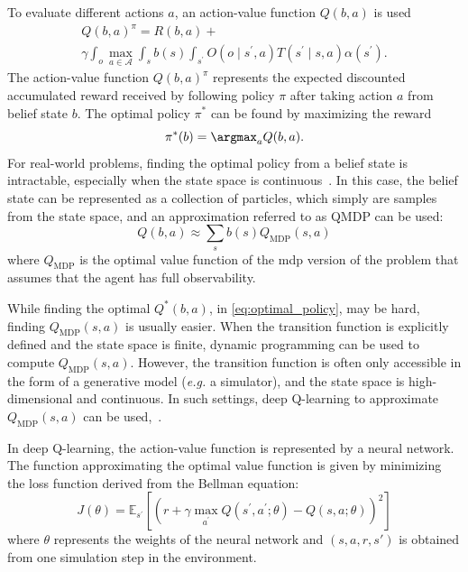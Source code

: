 To evaluate different actions $a$, an action-value function $Q(b, a)$ is used
\begin{equation}
    \begin{split}
        Q (b, a)^\pi = R(b,a) + \\
     \gamma \int_o \max_{a \in \mathcal{A}}\int_s b(s) \int_{s^\prime} O(o \mid s^\prime,a) T(s^\prime \mid s,a) \alpha(s^\prime).
    \end{split}
\end{equation}
The action-value function $Q(b, a)^\pi$ represents the expected discounted accumulated reward received by following policy $\pi$ after taking action $a$ from belief state $b$. The optimal policy $\pi^*$ can be found by maximizing the reward
\begin{equation}
    \pi^*(b) =\argmax_a Q(b, a).
    \label{eq:optimal_policy}
\end{equation}
For real-world problems, finding the optimal policy from a belief state is intractable, especially when the state space is continuous~\cite{Kochenderfer2015}. 
In this case, the belief state can be represented as a collection of particles, which simply are samples from the state space, and an approximation referred to as QMDP can be used:
\begin{equation}
    Q(b, a) \approx \sum_s b(s) Q_{\mathrm{MDP}}(s, a)
    \label{eq:qmdp}
\end{equation}
where $Q_{\mathrm{MDP}}$ is the optimal value function of the \gls{mdp} version of the problem that assumes that the agent has full observability.

While finding the optimal $Q^*(b, a)$, in \eqref{eq:optimal_policy}, may be hard, finding $Q_\mathrm{MDP}(s,a)$ is usually easier. 
When the transition function is explicitly defined and the state space is finite, dynamic programming can be used to compute $Q_\mathrm{MDP}(s, a)$. 
However, the transition function is often only accessible in the form of a generative model (\textit{e.g.} a simulator), and the state space is high-dimensional and continuous. In such settings, deep Q-learning to approximate $Q_{\mathrm{MDP}}(s,a)$ can be used,~\cite{Littman1995}. 

In deep Q-learning, the action-value function is represented by a neural network. The function approximating the optimal value function is given by minimizing the loss function derived from the Bellman equation:
\begin{equation}
    J(\theta) = \mathbb{E}_{s^\prime}[(r + \gamma \max_{a^\prime}Q(s^\prime, a^\prime; \theta) - Q(s, a; \theta))^2]
    \label{eq:dqn-loss}
\end{equation}
where $\theta$ represents the weights of the neural network and $(s, a, r, s')$ is obtained from one simulation step in the environment. 




